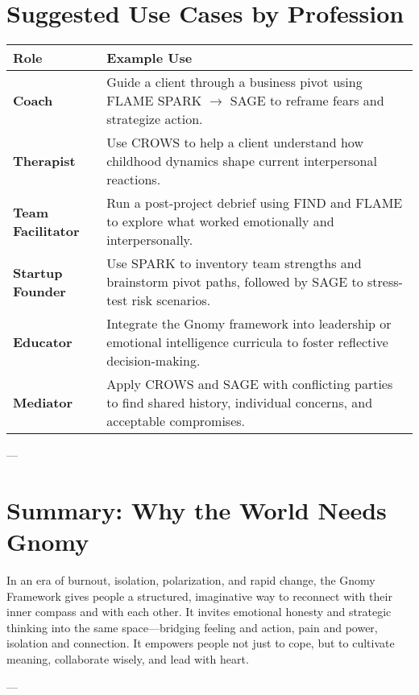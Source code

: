\documentclass{article}
\begin{document}
\section{Suggested Use Cases by Profession}
\begin{tabular}{|p{}|p{}|}
    \hline
    \textbf{Role} & \textbf{Example Use} \\
    \hline
    \textbf{Coach} & Guide a client through a business pivot using FLAME SPARK $\rightarrow$ SAGE to reframe fears and strategize action. \\
    \textbf{Therapist} & Use CROWS to help a client understand how childhood dynamics shape current interpersonal reactions. \\
    \textbf{Team Facilitator} & Run a post-project debrief using FIND and FLAME to explore what worked emotionally and interpersonally. \\
    \textbf{Startup Founder} & Use SPARK to inventory team strengths and brainstorm pivot paths, followed by SAGE to stress-test risk scenarios. \\
    \textbf{Educator} & Integrate the Gnomy framework into leadership or emotional intelligence curricula to foster reflective decision-making. \\
    \textbf{Mediator} & Apply CROWS and SAGE with conflicting parties to find shared history, individual concerns, and acceptable compromises. \\
    \hline
\end{tabular}

---

\section{Summary: Why the World Needs Gnomy}
In an era of burnout, isolation, polarization, and rapid change, the Gnomy Framework gives people a structured, imaginative way to reconnect with their inner compass and with each other. It invites emotional honesty and strategic thinking into the same space—bridging feeling and action, pain and power, isolation and connection. It empowers people not just to cope, but to cultivate meaning, collaborate wisely, and lead with heart.

---
\end{document}
